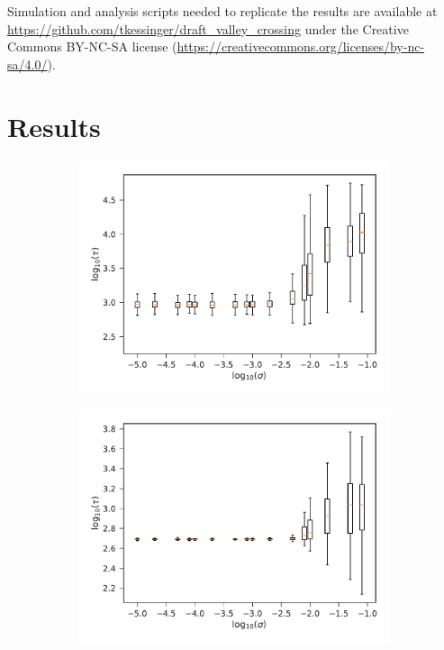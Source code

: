 \documentclass[10pt,twocolumn,twoside]{gsajnl}
\begin{document}
\begin{spacing}{1.5}
Simulation and analysis scripts needed to replicate the results are available at \url{https://github.com/tkessinger/draft_valley_crossing} under the Creative Commons BY-NC-SA license (\url{https://creativecommons.org/licenses/by-nc-sa/4.0/}).

\section{Results}

\begin{figure}[t]
\begin{subfigure}[b]{0.4\textwidth}
\includegraphics[width=\textwidth]{Figures/det_tunnel.pdf}
\end{subfigure}
\begin{subfigure}[b]{0.4\textwidth}
\includegraphics[width=\textwidth]{Figures/det_fix.pdf}

\end{subfigure}
\end{figure}
\end{spacing}
\end{document}
